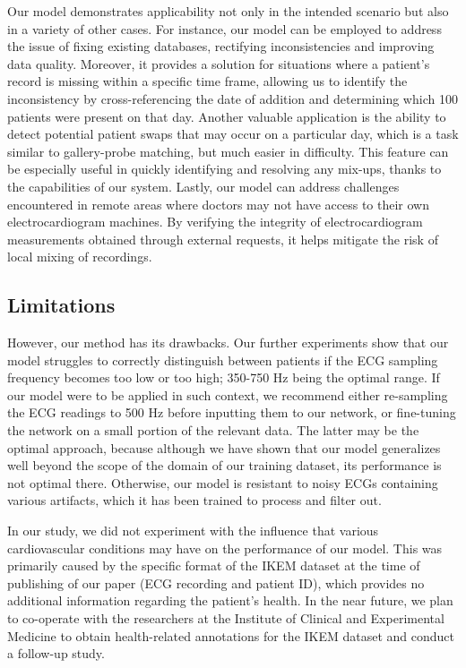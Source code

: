 \documentclass[preprint,12pt]{elsarticle}
\begin{document}
Our model demonstrates applicability not only in the intended scenario but also in a variety of other cases. For instance, our model can be employed to address the issue of fixing existing databases, rectifying inconsistencies and improving data quality. Moreover, it provides a solution for situations where a patient's record is missing within a specific time frame, allowing us to identify the inconsistency by cross-referencing the date of addition and determining which 100 patients were present on that day. Another valuable application is the ability to detect potential patient swaps that may occur on a particular day, which is a task similar to gallery-probe matching, but much easier in difficulty. This feature can be especially useful in quickly identifying and resolving any mix-ups, thanks to the capabilities of our system. Lastly, our model can address challenges encountered in remote areas where doctors may not have access to their own electrocardiogram machines. By verifying the integrity of electrocardiogram measurements obtained through external requests, it helps mitigate the risk of local mixing of recordings.

\subsection{Limitations}
However, our method has its drawbacks. Our further experiments show that our model struggles to correctly distinguish between patients if the ECG sampling frequency becomes too low or too high; 350-750 Hz being the optimal range. If our model were to be applied in such context, we recommend either re-sampling the ECG readings to 500 Hz before inputting them to our network, or fine-tuning the network on a small portion of the relevant data. The latter may be the optimal approach, because although we have shown that our model generalizes well beyond the scope of the domain of our training dataset, its performance is not optimal there. Otherwise, our model is resistant to noisy ECGs containing various artifacts, which it has been trained to process and filter out.

In our study, we did not experiment with the influence that various cardiovascular conditions may have on the performance of our model. This was primarily caused by the specific format of the IKEM dataset at the time of publishing of our paper (ECG recording and patient ID), which provides no additional information regarding the patient's health. In the near future, we plan to co-operate with the researchers at the Institute of Clinical and Experimental Medicine to obtain health-related annotations for the IKEM dataset and conduct a follow-up study.
\end{document}
